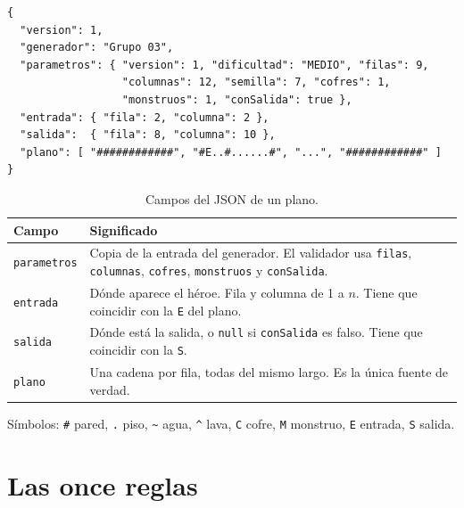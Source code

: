 \documentclass[11pt,a4paper]{article}
\begin{document}
\begin{lstlisting}[language={}]
{
  "version": 1,
  "generador": "Grupo 03",
  "parametros": { "version": 1, "dificultad": "MEDIO", "filas": 9,
                  "columnas": 12, "semilla": 7, "cofres": 1,
                  "monstruos": 1, "conSalida": true },
  "entrada": { "fila": 2, "columna": 2 },
  "salida":  { "fila": 8, "columna": 10 },
  "plano": [ "############", "#E..#......#", "...", "############" ]
}
\end{lstlisting}

\begin{table}[h]
\centering
\begin{tabularx}{\textwidth}{lX}
\toprule
Campo & Significado \\
\midrule
\texttt{parametros} & Copia de la entrada del generador. El validador usa
\texttt{filas}, \texttt{columnas}, \texttt{cofres}, \texttt{monstruos} y
\texttt{conSalida}. \\
\texttt{entrada} & D\'onde aparece el h\'eroe. Fila y columna de 1 a $n$. Tiene que
coincidir con la \texttt{E} del plano. \\
\texttt{salida} & D\'onde est\'a la salida, o \texttt{null} si \texttt{conSalida}
es falso. Tiene que coincidir con la \texttt{S}. \\
\texttt{plano} & Una cadena por fila, todas del mismo largo. Es la \'unica fuente
de verdad. \\
\bottomrule
\end{tabularx}
\caption{Campos del JSON de un plano.}
\end{table}

S\'imbolos: \texttt{\#} pared, \texttt{.} piso, \texttt{\~{}} agua, \texttt{\^{}} lava,
\texttt{C} cofre, \texttt{M} monstruo, \texttt{E} entrada, \texttt{S} salida.

\section{Las once reglas}
\end{document}
